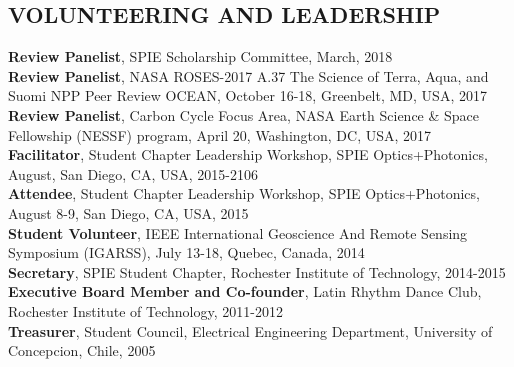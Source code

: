 \documentclass[11pt]{res} %
\begin{document}
\begin{resume}
\vspace{-0.1in}
\section{VOLUNTEERING AND LEADERSHIP}
\vspace{0.1in}
{\bf Review Panelist}, SPIE Scholarship Committee, March, 2018
\vspace{0.1in}\\
{\bf Review Panelist}, NASA ROSES-2017 A.37 The Science of Terra, Aqua, and Suomi NPP Peer Review OCEAN, October 16-18, Greenbelt, MD, USA, 2017
\vspace{0.1in}\\
{\bf Review Panelist}, Carbon Cycle Focus Area, NASA Earth Science \& Space Fellowship (NESSF) program, April 20, Washington, DC, USA, 2017
\vspace{0.1in}\\
{\bf Facilitator}, Student Chapter Leadership Workshop, SPIE Optics+Photonics, August, San Diego, CA, USA, 2015-2106
\vspace{0.1in}\\
{\bf Attendee}, Student Chapter Leadership Workshop, SPIE Optics+Photonics, August 8-9, San Diego, CA, USA, 2015
\vspace{0.1in}\\
{\bf Student Volunteer}, IEEE International Geoscience And Remote Sensing Symposium (IGARSS), July 13-18, Quebec, Canada, 2014
\vspace{0.1in}\\
{\bf Secretary}, SPIE Student Chapter, Rochester Institute of Technology, 2014-2015
\vspace{0.1in}\\
{\bf Executive Board Member and Co-founder}, Latin Rhythm Dance Club, Rochester Institute of Technology, 2011-2012
\vspace{0.1in}\\
{\bf Treasurer}, Student Council, Electrical Engineering Department, University of Concepcion, Chile, 2005\\



\end{resume}
\end{document}
